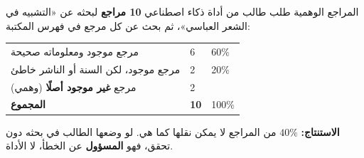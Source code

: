 \documentclass[a4paper]{article}
\begin{document}
\begin{mithal}{المراجع الوهمية}
طلب طالب من أداة ذكاء اصطناعي \textbf{10 مراجع} لبحثه عن «التشبيه في الشعر العباسي»،
ثم بحث عن كل مرجع في فهرس المكتبة:

\begin{center}
\begin{tabular}{|R{7cm}|C{2.2cm}|C{2.2cm}|}
    \hline
     &  &  \\ \hline
    مرجع موجود ومعلوماته صحيحة                    & 6 & 60\% \\ \hline
    مرجع موجود، لكن السنة أو الناشر خاطئ           & 2 & 20\% \\ \hline
    مرجع \textbf{غير موجود أصلًا} (وهمي)           & 2 &  \\ \hline
    \textbf{المجموع}                              & \textbf{10} & 100\% \\ \hline
\end{tabular}
\end{center}

\textbf{الاستنتاج:} $40\%$ من المراجع لا يمكن نقلها كما هي.
لو وضعها الطالب في بحثه دون تحقق، فهو \textbf{المسؤول} عن الخطأ، لا الأداة.
\end{mithal}

\end{document}
